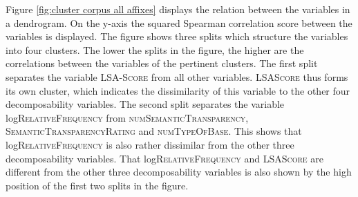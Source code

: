  
 \begin{table}[]

	\caption{Correlation matrix for decomposability measures in corpus study}
	\label{tab: Correlation matrix for all decomposability measures in corpus study}
	\begin{center}
\end{center}
 \end{table}
 
 
 


 

 
  Figure \ref{fig:cluster corpus all affixes} displays the relation between the variables in a dendrogram. On the y-axis the squared Spearman correlation score between the variables is displayed. 
  The figure shows three splits which structure the variables into four clusters. The lower the splits in the figure, the higher are the correlations between the variables of the pertinent clusters.
      The first split separates the  variable \textsc{LSA-Score} from all other variables. \textsc{LSAScore} thus forms its own cluster, which indicates the dissimilarity of this variable to the other four decomposability variables. The second split separates the variable log\textsc{RelativeFrequency} from \textsc{numSemanticTransparency}, \textsc{SemanticTransparencyRating} and \textsc{numTypeOfBase}. This shows that log\textsc{RelativeFrequency} is also rather dissimilar from the other three decomposability variables. 
      That log\textsc{RelativeFrequency} and \textsc{LSAScore} are different from the other three decomposability variables is also shown by the high position of the first two splits in the figure.
      
